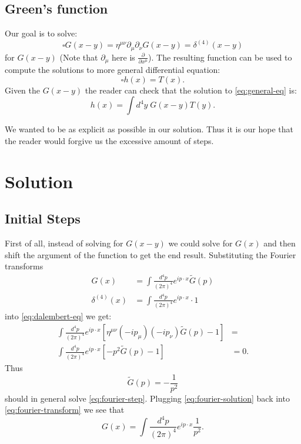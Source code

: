\documentclass[aps,prd,final,twocolumn,floats,floatfix,nofootinbib,10pt]{revtex4-1}
\begin{document}
\subsection{Green's function}

Our goal is to solve:
\begin{equation}\label{eq:dalembert-eq}
\square G(x - y) = \eta^{\mu\nu} \partial_\mu \partial_\nu G(x - y) = \delta^{(4)} (x - y)
\end{equation}
for $G(x - y)$ (Note that $\partial_\mu$ here is $\frac{\partial}{\partial x^\mu}$).
The resulting function can be used to compute the solutions to more general differential equation:
\begin{equation}\label{eq:general-eq}
\square h(x) = T(x).
\end{equation}
Given the $G(x - y)$ the reader can check that the solution to \eqref{eq:general-eq} is:
\begin{equation}
h(x) = \int d^4y \; G(x - y) T(y).
\end{equation}

We wanted to be as explicit as possible in our solution. Thus it is our hope that the reader would forgive us the
excessive amount of steps.

\section{Solution}

\subsection{Initial Steps}

First of all, instead of solving for $G(x - y)$ we could solve for $G(x)$ and then shift the argument of the function
to get the end result. Substituting the Fourier transforms
\begin{align}\label{eq:fourier-transform}
G(x) & = \int \frac{d^4p}{(2 \pi)^4} e^{i p \cdot x} \tilde{G}(p) \\
\delta^{(4)} (x) & = \int \frac{d^4p}{(2 \pi)^4} e^{i p \cdot x} \cdot 1
\end{align}
into \eqref{eq:dalembert-eq} we get:
\begin{align}\label{eq:fourier-step}
\int \frac{d^4p}{(2 \pi)^4} e^{i p \cdot x} \left[ \eta^{\mu\nu} (-i p_\mu) (-i p_\nu) \tilde{G}(p) - 1 \right] & = \\
\int \frac{d^4p}{(2 \pi)^4} e^{i p \cdot x} \left[ -p^2 \tilde{G}(p) - 1 \right] & = 0.
\end{align}
Thus
\begin{equation}\label{eq:fourier-solution}
\tilde{G}(p) = -\frac{1}{p^2}
\end{equation}
should in general solve \eqref{eq:fourier-step}. Plugging \eqref{eq:fourier-solution} back into
\eqref{eq:fourier-transform} we see that
\begin{equation}\label{eq:complex-integral}
G(x) = \int \frac{d^4p}{(2 \pi)^4} e^{i p \cdot x} \frac{1}{p^2}.
\end{equation}
\end{document}
